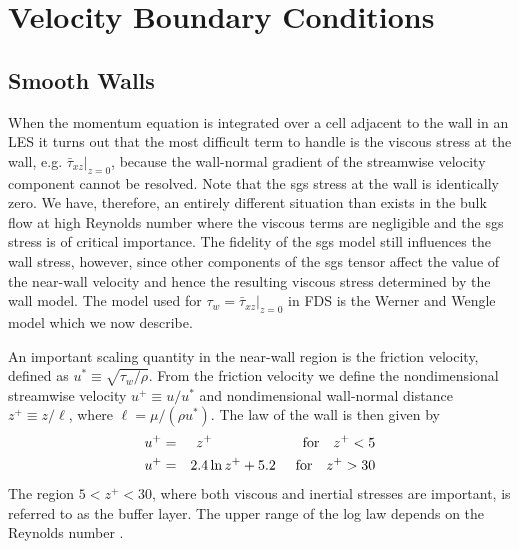 \section{Velocity Boundary Conditions}

\subsection{Smooth Walls}
\label{WW_model}

When the momentum equation is integrated over a cell adjacent to the wall in an LES it turns out that the most difficult term to handle is the viscous stress at the wall, e.g. $\bar{\tau}_{xz}|_{z=0}$, because the wall-normal gradient of the streamwise velocity component cannot be resolved. Note that the sgs stress at the wall is identically zero.  We have, therefore, an entirely different situation than exists in the bulk flow at high Reynolds number
where the viscous terms are negligible and the sgs stress is of critical importance.  The fidelity of the sgs model still influences the wall stress, however,
since other components of the sgs tensor affect the value of the near-wall velocity and hence the resulting viscous stress determined by the wall model.
The model used for $\tau_w = \bar{\tau}_{xz}|_{z=0}$ in FDS is the Werner and Wengle model \cite{Werner:1991} which we now describe.

An important scaling quantity in the near-wall region is the friction velocity, defined as $u^* \equiv \sqrt{\tau_w/\rho}$.
From the friction velocity we define the nondimensional streamwise velocity $u^+ \equiv u/u^*$ and nondimensional wall-normal distance $z^+ \equiv z/\ell$,
where $\ell = \mu/(\rho u^*)$. The law of the wall is then given by \cite{Pope:2000,TennekesLumley}
\begin{eqnarray}
\label{eqn_visclayer} u^+ &=& z^+                \hspace{2.27cm}\mbox{for} \quad z^+ < 5 \\
\label{eqn_loglaw}    u^+ &=& 2.4 \ln z^+ + 5.2  \hspace{0.50cm}\mbox{for} \quad z^+ > 30
\end{eqnarray}
The region $5 < z^+ < 30$, where both viscous and inertial stresses are important, is referred to as the buffer layer.  The upper range of the log law depends on the Reynolds number \cite{Pope:2000,Zagarola:1997}.

